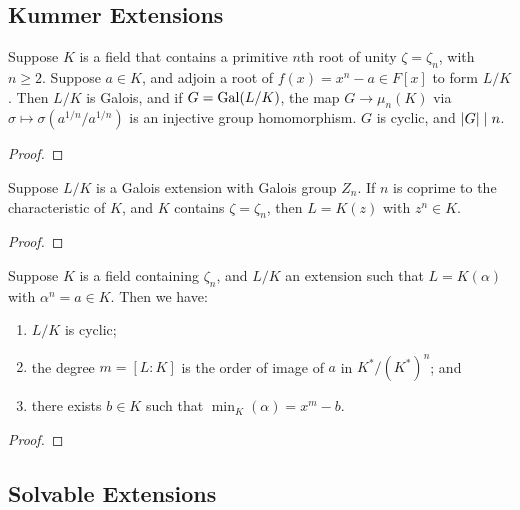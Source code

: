 \subsection*{Kummer Extensions}

\begin{proposition}
    Suppose \(K\) is a field
    that contains a primitive \(n\)th root of unity \(\zeta = \zeta_n\),
    with \(n \geq 2\).
    Suppose \(a \in K\), and adjoin a root of \(f(x) = x^n - a \in F[x]\)
    to form \(L/K\).
    Then \(L/K\) is Galois, and if \(G = \operatorname{Gal}(L/K)\),
    the map \(G \to \mu_n(K)\) via \(\sigma \mapsto \sigma(a^{1/n}/a^{1/n})\)
    is an injective group homomorphism.
    \(G\) is cyclic, and \(\abs{G} \mid n\).
\end{proposition}
\begin{proof}
\end{proof}

\begin{lemma}
    Suppose \(L/K\) is a Galois extension with Galois group \(Z_n\).
    If \(n\) is coprime to the characteristic of \(K\),
    and \(K\) contains \(\zeta = \zeta_n\),
    then \(L = K(z)\) with \(z^n \in K\).
\end{lemma}
\begin{proof}
\end{proof}
\begin{proposition}
    Suppose \(K\) is a field containing \(\zeta_n\),
    and \(L/K\) an extension such that \(L = K(\alpha)\) with \(\alpha^n = a \in K\).
    Then we have:
    \begin{enumerate}[label={(\alph*)}, itemsep=0mm]
        \item \(L/K\) is cyclic;
        \item the degree \(m = [L:K]\) is the order of image of \(a\) in \(K^\ast/{(K^\ast)}^n\); and
        \item there exists \(b \in K\) such that \(\min_K(\alpha) = x^m - b\).
    \end{enumerate}
\end{proposition}
\begin{proof}
\end{proof}

\subsection*{Solvable Extensions}

